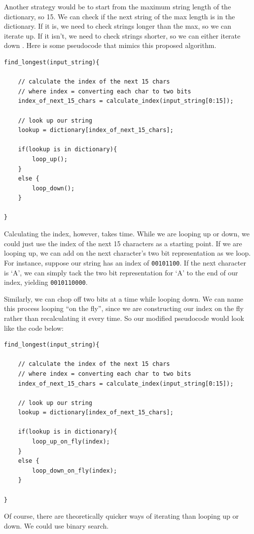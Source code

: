 \documentclass[12pt,twoside]{reedthesis}
\begin{document}
Another strategy would be to start from the maximum string length of the dictionary, so 15. We can check if the next string of the max length is in the dictionary. If it is, we need to check strings longer than the max, so we can iterate up. If it isn't, we need to check strings shorter, so we can either iterate down . Here is some pseudocode that mimics this proposed algorithm.
\begin{verbatim}
find_longest(input_string){

    // calculate the index of the next 15 chars
    // where index = converting each char to two bits
    index_of_next_15_chars = calculate_index(input_string[0:15]);

    // look up our string
    lookup = dictionary[index_of_next_15_chars];

    if(lookup is in dictionary){
        loop_up();
    }
    else {
        loop_down();
    }
    
}
\end{verbatim}
Calculating the index, however, takes time. While we are looping up or down, we could just use the index of the next 15 characters as a starting point. If we are looping up, we can add on the next character's two bit representation as we loop. For instance, suppose our string has an index of \texttt{00101100}. If the next character is `A', we can simply tack the two bit representation for `A' to the end of our index, yielding \texttt{00101100\textbar{}00}.

Similarly, we can chop off two bits at a time while looping down. We can name this process looping ``on the fly'', since we are constructing our index on the fly rather than recalculating it every time. So our modified pseudocode would look like the code below:
\begin{verbatim}
find_longest(input_string){

    // calculate the index of the next 15 chars
    // where index = converting each char to two bits
    index_of_next_15_chars = calculate_index(input_string[0:15]);

    // look up our string
    lookup = dictionary[index_of_next_15_chars];

    if(lookup is in dictionary){
        loop_up_on_fly(index);
    }
    else {
        loop_down_on_fly(index);
    }
    
}
\end{verbatim}
Of course, there are theoretically quicker ways of iterating than looping up or down. We could use binary search.
\end{document}
